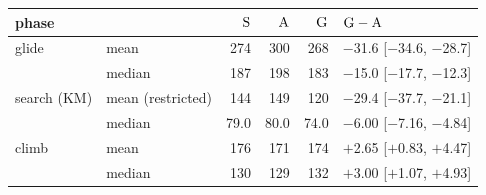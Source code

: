 \begin{tabular}{@{}l l r r r l@{}}
\toprule
phase & & $\mathrm{S}$ & $\mathrm{A}$ & $\mathrm{G}$ & $\mathrm{G}-\mathrm{A}$ \\
\midrule
glide & mean & 274 & 300 & 268 & $-$31.6 [$-$34.6, $-$28.7] \\
 & median & 187 & 198 & 183 & $-$15.0 [$-$17.7, $-$12.3] \\
\addlinespace
search (KM) & mean (restricted) & 144 & 149 & 120 & $-$29.4 [$-$37.7, $-$21.1] \\
 & median & 79.0 & 80.0 & 74.0 & $-$6.00 [$-$7.16, $-$4.84] \\
\addlinespace
climb & mean & 176 & 171 & 174 & $+$2.65 [$+$0.83, $+$4.47] \\
 & median & 130 & 129 & 132 & $+$3.00 [$+$1.07, $+$4.93] \\
\bottomrule
\end{tabular}
